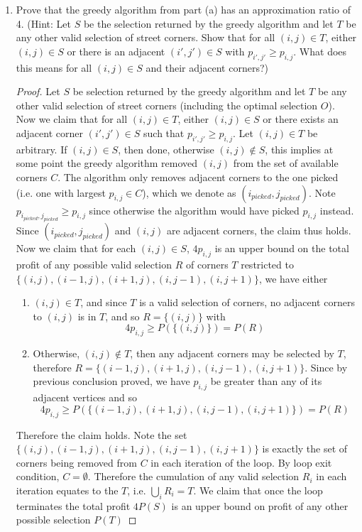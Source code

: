 \documentclass[11pt]{article}
\begin{document}
\begin{enumerate}
\begin{solution}
    \end{solution}
    \item Prove that the greedy algorithm from part (a) has an approximation ratio of 4. (Hint: Let $S$ be the selection returned by the greedy algorithm and let $T$ be any other valid selection of street corners. Show that for all $(i,j) \in T$, either $(i,j) \in S$ or there is an adjacent $(i',j')\in S$ with $p_{i', j'} \geq p_{i,j}$. What does this means for all $(i,j) \in S$ and their adjacent corners?)
    \begin{proof}
        Let $S$ be selection returned by the greedy algorithm and let $T$ be any other valid selection of street corners (including the optimal selection $O$). Now we claim that for all $(i,j)\in T$, either $(i,j)\in S$ or there exists an adjacent corner $(i', j')\in S$ such that $p_{i', j'} \geq p_{i,j}$. Let $(i,j)\in T$ be arbitrary. If $(i,j)\in S$, then done, otherwise $(i,j)\not\in S$, this implies at some point the greedy algorithm removed $(i,j)$ from the set of available corners $C$. The algorithm only removes adjacent corners to the one picked (i.e. one with largest $p_{i,j} \in C$), which we denote as $(i_{picked}, j_{picked})$. Note $p_{i_{picked}, j_{picked}} \geq p_{i,j}$ since otherwise the algorithm would have picked $p_{i,j}$ instead. Since $(i_{picked}, j_{picked})$ and $(i,j)$ are adjacent corners, the claim thus holds. Now we claim that for each $(i,j)\in S$, $4p_{i,j}$ is an upper bound on the total profit of any possible valid selection $R$ of corners $T$ restricted to $\{ (i,j),(i-1,j),(i+1,j),(i,j-1),(i,j+1)\}$, we have either 
        \begin{enumerate}
            \item $(i, j)\in T$, and since $T$ is a valid selection of corners, no adjacent corners to $(i,j)$ is in $T$, and so $R = \{(i,j)\}$ with 
            \[
               4p_{i,j} \geq P(\{(i,j)\}) = P(R)
            \]
            \item Otherwise, $(i,j)\not\in T$, then any adjacent corners may be selected by $T$, therefore $R = \{(i-1,j),(i+1,j),(i,j-1),(i,j+1)\}$. Since by previous conclusion proved, we have $p_{i,j}$ be greater than any of its adjacent vertices and so 
            \[
                4p_{i,j} \geq P(\{(i-1,j),(i+1,j),(i,j-1),(i,j+1)\}) = P(R) 
            \]
        \end{enumerate}
        Therefore the claim holds. Note the set $\{(i,j),(i-1,j),(i+1,j),(i,j-1),(i,j+1)\}$ is exactly the set of corners being removed from $C$ in each iteration of the loop. By loop exit condition, $C = \emptyset$. Therefore the cumulation of any valid selection $R_i$ in each iteration equates to the $T$, i.e. $\bigcup_i R_i = T$. We claim that once the loop terminates the total profit $4P(S)$ is an upper bound on profit of any other possible selection $P(T)$

\end{proof}
\end{enumerate}
\end{document}
